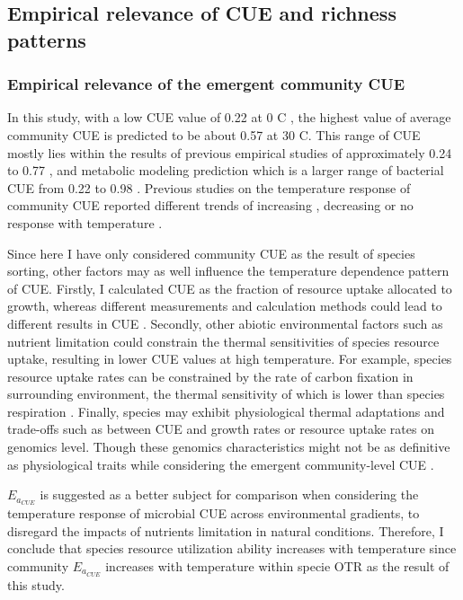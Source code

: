 \documentclass[11pt, a4paper]{article}
\begin{document}
\begin{spacing}{1.5}
\subsection{Empirical relevance of CUE and richness patterns}

\subsubsection{Empirical relevance of the emergent community CUE}

In this study, with a low CUE value of 0.22 at 0 \textdegree C \citep{smith2020systematic}, the highest value of average community CUE is predicted to be about 0.57 at 30 \textdegree C. This range of CUE mostly lies within the results of previous empirical studies of approximately 0.24 to 0.77 \citep{geyer2016microbial}, and metabolic modeling prediction which is a larger range of bacterial CUE from 0.22 to 0.98 \citep{saifuddin2019microbial}. Previous studies on the temperature response of community CUE reported different trends of increasing \citep{sinsabaugh2016stoichiometry}, decreasing \citep{qiao2019global, steinweg2008patterns} or no response with temperature \citep{oquist2017effect}. 

Since here I have only considered community CUE as the result of species sorting, other factors may as well influence the temperature dependence pattern of CUE. Firstly, I calculated CUE as the fraction of resource uptake allocated to growth, whereas different measurements and calculation methods could lead to different results in CUE \citep{geyer2019clarifying}. Secondly, other abiotic environmental factors such as nutrient limitation could constrain the thermal sensitivities of species resource uptake, resulting in lower CUE values at high temperature. For example, species resource uptake rates can be constrained by the rate of carbon fixation in surrounding environment, the thermal sensitivity of which is lower than species respiration \citep{allen2005linking, sinsabaugh2017plant}. Finally, species may exhibit physiological thermal adaptations \citep{sinsabaugh2016stoichiometry, bradford2013thermal, kontopoulos2020adaptive} and trade-offs such as between CUE and growth rates \citep{roller2016exploiting} or resource uptake rates \citep{allison2014modeling} on genomics level. Though these genomics characteristics might not be as definitive as physiological traits while considering the emergent community-level CUE \citep{pold2020carbon}. 

$E_{a_{CUE}}$ is suggested as a better subject for comparison when considering the temperature response of microbial CUE across environmental gradients, to disregard the impacts of nutrients limitation in natural conditions\citep{pold2020carbon}. Therefore, I conclude that species resource utilization ability increases with temperature since community $E_{a_{CUE}}$ increases with temperature within specie OTR as the result of this study.


\end{spacing}
\end{document}
